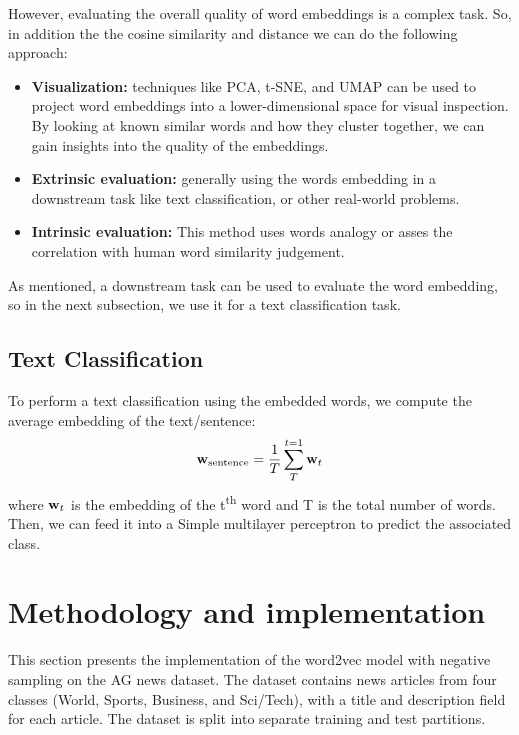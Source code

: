    However, evaluating the overall quality of word embeddings is a complex task. So, in addition the the cosine similarity and distance we can do the following approach:
   \begin{itemize}
	   \item \textbf{Visualization:} techniques like PCA, t-SNE, and UMAP can be used to project word embeddings into a lower-dimensional space for visual inspection. By looking at known similar words and how they cluster together, we can gain insights into the quality of the embeddings.
	   \item \textbf{Extrinsic evaluation:} generally using the words embedding in a downstream task like text classification, or other real-world problems.
	   \item \textbf{Intrinsic evaluation:} This method uses words analogy or asses the correlation with human word similarity judgement.
   \end{itemize}

   As mentioned, a downstream task can be used to evaluate the word embedding, so in the next subsection, we use it for a text classification task.
   \subsection{Text Classification}
   To perform a text classification using the embedded words, we compute the average embedding of the text/sentence:
   \begin{equation}
	\mathbf{w}_{\mathrm{sentence}} = \frac{1}{T}\sum_{T}^{t=1}\mathbf{w}_t
   \end{equation}
   where $\mathbf{w}_t$ is the embedding of the t\textsuperscript{th} word and T is the total number of words.
   Then, we can feed it into a Simple multilayer perceptron to predict the associated class.

   \section{Methodology and implementation}\label{sec3}
   This section presents the implementation of the word2vec model with negative sampling on the AG news dataset. The dataset contains news articles from four classes (World, Sports, Business, and Sci/Tech), with a title and description field for each article. The dataset is split into separate training and test partitions.

